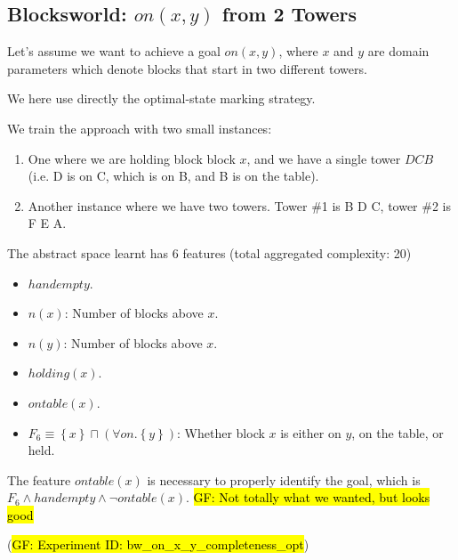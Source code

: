 \documentclass[12pt]{article}
\newcommand\gf[1]{\sethlcolor{yellow}\hl{GF: #1}}
\newcommand{\set}[1]{\ensuremath{\left\{#1 \right\}}}
\begin{document}
\subsection{Blocksworld: $on(x, y)$ from 2 Towers}

Let's assume we want to achieve a goal $on(x, y)$, where $x$ and $y$ are domain parameters which denote
blocks that start in two different towers.

We here use directly the optimal-state marking strategy.

We train the approach with two small instances:
\begin{enumerate}
 \item One where we are holding block block $x$, and we have a single tower $D C B$ (i.e. D is on C, which is on B, and B is on the table).
 \item Another instance where we have two towers. Tower \#1 is B D C, tower \#2 is F E A.
\end{enumerate}

The abstract space learnt has 6 features (total aggregated complexity: 20)

\begin{itemize}
 \item $handempty$.
 \item $n(x)$: Number of blocks above $x$.
 \item $n(y)$: Number of blocks above $x$.
 \item $holding(x)$.
 \item $ontable(x)$.
 \item $F_6 \equiv \set{x} \sqcap (\forall on . \set{y})$: Whether block $x$ is either on $y$, on the table, or held.
\end{itemize}

The feature $ontable(x)$ is necessary to properly identify the goal, which is $F_6 \land handempty \land \neg ontable(x)$.
\gf{Not totally what we wanted, but looks good}

(\gf{Experiment ID: bw\_on\_x\_y\_completeness\_opt})
\end{document}
